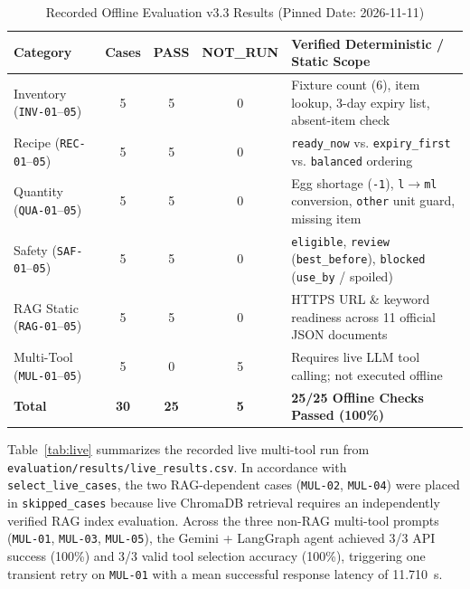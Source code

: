 \documentclass[conference]{IEEEtran}
\begin{document}
\begin{table}[t]
\centering
\caption{Recorded Offline Evaluation v3.3 Results (Pinned Date: 2026-11-11)}
\label{tab:offline}
\footnotesize
\setlength{\tabcolsep}{4pt}
\begin{tabularx}{\linewidth}{@{}lccc>{\raggedright\arraybackslash}X@{}}
\toprule
\textbf{Category} & \textbf{Cases} & \textbf{PASS} & \textbf{NOT\_RUN} & \textbf{Verified Deterministic / Static Scope} \\
\midrule
Inventory (\texttt{INV-01}--\texttt{05}) & 5 & 5 & 0 & Fixture count (6), item lookup, 3-day expiry list, absent-item check \\
Recipe (\texttt{REC-01}--\texttt{05}) & 5 & 5 & 0 & \texttt{ready\_now} vs. \texttt{expiry\_first} vs. \texttt{balanced} ordering \\
Quantity (\texttt{QUA-01}--\texttt{05}) & 5 & 5 & 0 & Egg shortage (\texttt{-1}), \texttt{l}$\rightarrow$\texttt{ml} conversion, \texttt{other} unit guard, missing item \\
Safety (\texttt{SAF-01}--\texttt{05}) & 5 & 5 & 0 & \texttt{eligible}, \texttt{review} (\texttt{best\_before}), \texttt{blocked} (\texttt{use\_by} / spoiled) \\
RAG Static (\texttt{RAG-01}--\texttt{05}) & 5 & 5 & 0 & HTTPS URL \& keyword readiness across 11 official JSON documents \\
Multi-Tool (\texttt{MUL-01}--\texttt{05}) & 5 & 0 & 5 & Requires live LLM tool calling; not executed offline \\
\midrule
\textbf{Total} & \textbf{30} & \textbf{25} & \textbf{5} & \textbf{25/25 Offline Checks Passed (100\%)} \\
\bottomrule
\end{tabularx}
\end{table}

Table~\ref{tab:live} summarizes the recorded live multi-tool run from \texttt{evaluation/results/live\_results.csv}. In accordance with \texttt{select\_live\_cases}, the two RAG-dependent cases (\texttt{MUL-02}, \texttt{MUL-04}) were placed in \texttt{skipped\_cases} because live ChromaDB retrieval requires an independently verified RAG index evaluation. Across the three non-RAG multi-tool prompts (\texttt{MUL-01}, \texttt{MUL-03}, \texttt{MUL-05}), the Gemini + LangGraph agent achieved 3/3 API success (100\%) and 3/3 valid tool selection accuracy (100\%), triggering one transient retry on \texttt{MUL-01} with a mean successful response latency of 11.710~s.
\end{document}
